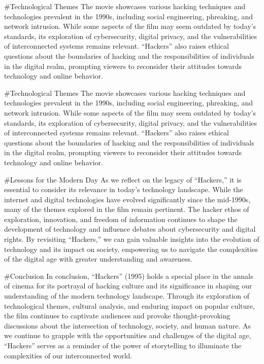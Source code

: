 \documentclass[
  openany]{book}
\begin{document}
\#Technological Themes
The movie showcases various hacking techniques and technologies prevalent in the 1990s, including social engineering, phreaking, and network intrusion. While some aspects of the film may seem outdated by today's standards, its exploration of cybersecurity, digital privacy, and the vulnerabilities of interconnected systems remains relevant. ``Hackers'' also raises ethical questions about the boundaries of hacking and the responsibilities of individuals in the digital realm, prompting viewers to reconsider their attitudes towards technology and online behavior.

\#Technological Themes
The movie showcases various hacking techniques and technologies prevalent in the 1990s, including social engineering, phreaking, and network intrusion. While some aspects of the film may seem outdated by today's standards, its exploration of cybersecurity, digital privacy, and the vulnerabilities of interconnected systems remains relevant. ``Hackers'' also raises ethical questions about the boundaries of hacking and the responsibilities of individuals in the digital realm, prompting viewers to reconsider their attitudes towards technology and online behavior.

\#Lessons for the Modern Day
As we reflect on the legacy of ``Hackers,'' it is essential to consider its relevance in today's technology landscape. While the internet and digital technologies have evolved significantly since the mid-1990s, many of the themes explored in the film remain pertinent. The hacker ethos of exploration, innovation, and freedom of information continues to shape the development of technology and influence debates about cybersecurity and digital rights. By revisiting ``Hackers,'' we can gain valuable insights into the evolution of technology and its impact on society, empowering us to navigate the complexities of the digital age with greater understanding and awareness.

\#Conclusion
In conclusion, ``Hackers'' (1995) holds a special place in the annals of cinema for its portrayal of hacking culture and its significance in shaping our understanding of the modern technology landscape. Through its exploration of technological themes, cultural analysis, and enduring impact on popular culture, the film continues to captivate audiences and provoke thought-provoking discussions about the intersection of technology, society, and human nature. As we continue to grapple with the opportunities and challenges of the digital age, ``Hackers'' serves as a reminder of the power of storytelling to illuminate the complexities of our interconnected world.
\end{document}

